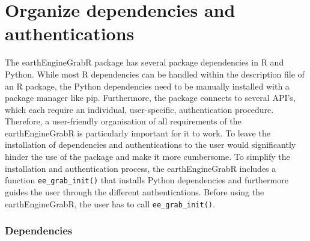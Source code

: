 \section{Organize dependencies and authentications}


The earthEngineGrabR package has several package dependencies in R and Python. While most R dependencies can be handled within the description file of an R package, the Python dependencies need to be manually installed with a package manager like pip. Furthermore, the package connects to several API's, which each require an individual, user-specific, authentication procedure. Therefore, a user-friendly organisation of all requirements of the earthEngineGrabR is particularly important for it to work. To leave the installation of dependencies and authentications to the user would significantly hinder the use of the package and make it more cumbersome. To simplify the installation and authentication process, the earthEngineGrabR includes a function \texttt{ee\_grab\_init()} that installs Python dependencies and furthermore guides the user through the different authentications. Before using the earthEngineGrabR, the user has to call \texttt{ee\_grab\_init()}. 

\subsubsection{Dependencies}

